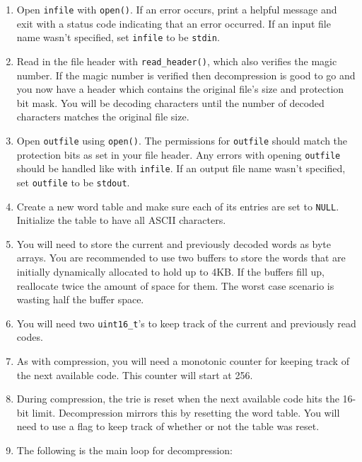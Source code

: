 \documentclass{article}
\begin{document}
\begin{enumerate}
    \item Open \texttt{infile} with \texttt{open()}. If an error occurs, print a
        helpful message and exit with a status code indicating that an error
        occurred. If an input file name wasn't specified, set \texttt{infile} to
        be \texttt{stdin}.
    \item Read in the file header with \texttt{read\_header()}, which also
        verifies the magic number. If the magic number is verified then
        decompression is good to go and you now have a header which contains the
        original file's size and protection bit mask. You will be decoding
        characters until the number of decoded characters matches the original
        file size.
    \item Open \texttt{outfile} using \texttt{open()}. The permissions for
        \texttt{outfile} should match the protection bits as set in your file
        header. Any errors with opening \texttt{outfile} should be handled like
        with \texttt{infile}. If an output file name wasn't specified, set
        \texttt{outfile} to be \texttt{stdout}.
    \item Create a new word table and make sure each of its entries are set to
        \texttt{NULL}. Initialize the table to have all ASCII characters.
    \item You will need to store the current and
        previously decoded words as byte arrays. You are recommended to use two
        buffers to store the words that are initially dynamically allocated to
        hold up to 4KB. If the buffers fill up, reallocate twice the amount of
        space for them. The worst case scenario is wasting half the buffer
        space.
    \item You will need two \texttt{uint16\_t}'s to keep track of the
        current and previously read codes.
    \item As with compression, you will need a monotonic counter for keeping
        track of the next available code. This counter will start at 256.
    \item During compression, the trie is reset when the next available code
        hits the 16-bit limit. Decompression mirrors this by resetting
        the word table. You will need to use a flag to keep track of whether or
        not the table was reset.
    \item The following is the main loop for decompression:
        \begin{enumerate}

\end{enumerate}
\end{enumerate}
\end{document}
